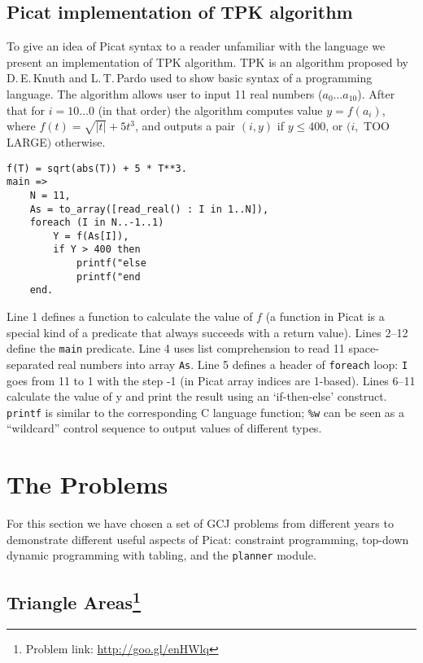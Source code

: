\documentclass{llncs}
\begin{document}
\subsection*{Picat implementation of TPK algorithm}

To give an idea of Picat syntax to a reader unfamiliar with the language we present an implementation of TPK algorithm.
TPK is an algorithm proposed by D.\,E.\,Knuth and L.\,T.\,Pardo  \cite{knuth1976early} used to show basic syntax of a programming language.
The algorithm allows user to input 11 real numbers ($a_0 \dots a_{10}$).
After that for $i = 10 \dots 0$ (in that order) the algorithm computes value $y = f(a_i)$, where $f(t) = \sqrt{|t|} + 5 {t}^3$, and outputs a pair $(i, y)$ if $y \leq 400$, or $(i,$ TOO LARGE$)$ otherwise.

\begin{lstlisting}[caption={TPK algorithm in Picat}]
f(T) = sqrt(abs(T)) + 5 * T**3.
main =>
    N = 11,
    As = to_array([read_real() : I in 1..N]),
    foreach (I in N..-1..1)
        Y = f(As[I]),
        if Y > 400 then
            printf("else
            printf("end
    end.
\end{lstlisting}

Line 1 defines a function to calculate the value of $f$ (a function in Picat is a special kind of a predicate that always succeeds with a return value).
Lines 2--12 define the \texttt{main} predicate.
Line 4 uses list comprehension to read 11 space-separated real numbers into array \texttt{As}.
Line 5 defines a header of \texttt{foreach} loop: \texttt{I} goes from 11 to 1 with the step -1 (in Picat array indices are 1-based).
Lines 6--11 calculate the value of y and print the result using an `if-then-else' construct.
\texttt{printf} is similar to the corresponding C language function; \texttt{\%w} can be seen as a ``wildcard'' control sequence to output values of different types.

\section{The Problems}
For this section we have chosen a set of GCJ problems from different years to demonstrate different useful aspects of Picat: constraint programming,
top-down dynamic programming with tabling, and the \texttt{planner} module.

\subsection*{Triangle Areas\footnote{Problem link: \url{http://goo.gl/enHWlq}}}
\end{document}
